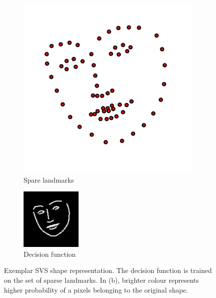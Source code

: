 \begin{figure}[h]
    \centering
    \begin{subfigure}[b]{0.4\textwidth}
            \includegraphics[width=\textwidth]{resources/landmark}
        \caption{Spare landmarks}
    \end{subfigure}
    \hfill
    \begin{subfigure}[b]{0.4\textwidth}
            \includegraphics[width=\textwidth]{resources/svs}
        \caption{Decision function}
        \label{fig:svs}
    \end{subfigure}
    \caption{Exemplar SVS shape representation. The decision function is trained on the set of sparse landmarks. In (b), brighter colour represents higher probability of a pixels belonging to the original shape.}
    \label{fig:build_svs}
\end{figure}


